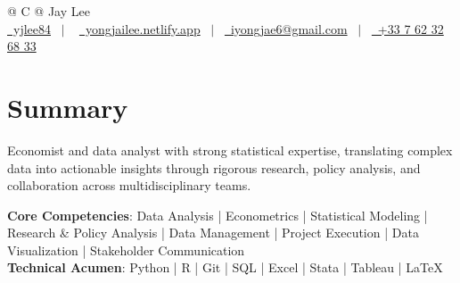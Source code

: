 \documentclass[a4paper,12pt]{article}
\begin{document}
\pagestyle{empty} 



\begin{tabularx}{\linewidth}{@{} C @{}}
\Huge{Jay Lee} \\[7.5pt]
\href{https://github.com/yjlee84}{\raisebox{-0.05\height}\faGithub\ yjlee84} \ $|$ \ 
\href{https://yongjailee.netlify.app}{\raisebox{-0.05\height}\faGlobe \ yongjailee.netlify.app} \ $|$ \ 
\href{mailto:email@mysite.com}{\raisebox{-0.05\height}\faEnvelope \ iyongjae6@gmail.com} \ $|$ \ 
\href{tel:+000000000000}{\raisebox{-0.05\height}\faMobile \ +33 7 62 32 68 33} \\
\end{tabularx}


\section{Summary}
Economist and data analyst with strong statistical expertise, translating complex data into actionable insights through rigorous research, policy analysis, and collaboration across multidisciplinary teams.

\textbf{Core Competencies}: Data Analysis | Econometrics | Statistical Modeling | Research \& Policy Analysis | Data Management | Project Execution | Data Visualization | Stakeholder Communication\\
\textbf{Technical Acumen}: Python | R | Git | SQL | Excel | Stata | Tableau | \LaTeX{}
\end{document}
